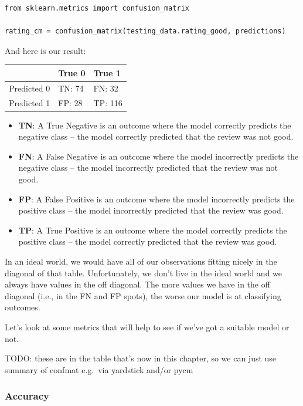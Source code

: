\documentclass[
  letterpaper,
]{krantz}
\begin{document}
\begin{verbatim}
from sklearn.metrics import confusion_matrix

rating_cm = confusion_matrix(testing_data.rating_good, predictions)
\end{verbatim}

And here is our result:

\begin{longtable*}{cll}
\toprule
  & True 0 & True 1 \\ 
\midrule\addlinespace[2.5pt]
Predicted 0 & TN: 74 & FN: 32 \\ 
Predicted 1 & FP: 28 & TP: 116 \\ 
\bottomrule
\end{longtable*}

\begin{itemize}
\item
  \textbf{TN}: A True Negative is an outcome where the model correctly
  predicts the negative class -- the model correctly predicted that the
  review was not good.
\item
  \textbf{FN}: A False Negative is an outcome where the model
  incorrectly predicts the negative class -- the model incorrectly
  predicted that the review was not good.
\item
  \textbf{FP}: A False Positive is an outcome where the model
  incorrectly predicts the positive class -- the model incorrectly
  predicted that the review was good.
\item
  \textbf{TP}: A True Positive is an outcome where the model correctly
  predicts the positive class -- the model correctly predicted that the
  review was good.
\end{itemize}

In an ideal world, we would have all of our observations fitting nicely
in the diagonal of that table. Unfortunately, we don't live in the ideal
world and we always have values in the off diagonal. The more values we
have in the off diagonal (i.e., in the FN and FP spots), the worse our
model is at classifying outcomes.

Let's look at some metrics that will help to see if we've got a suitable
model or not.

TODO: these are in the table that's now in this chapter, so we can just
use summary of confmat e.g.~via yardstick and/or pycm

\subsubsection{Accuracy}\label{accuracy}
\end{document}
